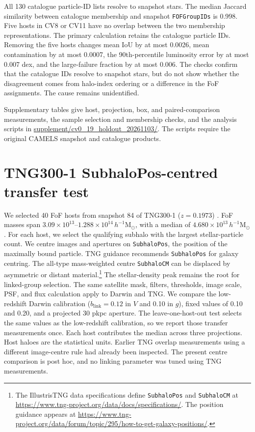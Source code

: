 \documentclass[usenatbib]{mnras}
\begin{document}
All 130 catalogue particle-ID lists resolve to snapshot stars. The median
Jaccard similarity between catalogue membership and snapshot
\texttt{FOFGroupIDs} is 0.998. Five hosts in CV8 or CV11 have no overlap
between the two membership representations. The primary calculation retains
the catalogue particle IDs. Removing the five hosts changes mean IoU by at
most 0.0026, mean contamination by at most 0.0007, the 90th-percentile
luminosity error by at most 0.007 dex, and the large-failure fraction by at
most 0.006. The checks confirm that the catalogue IDs resolve to snapshot
stars, but do not show whether the disagreement comes from halo-index ordering
or a difference in the FoF assignments. The cause remains unidentified.

Supplementary tables give host, projection, box, and paired-comparison
measurements, the sample selection and membership checks, and the
analysis scripts in
\url{supplement/cv0_19_holdout_20261103/}. The scripts require the
original CAMELS snapshot and catalogue products.

\section{TNG300-1 SubhaloPos-centred transfer test}

We selected 40 FoF hosts from snapshot 84 of TNG300-1 ($z=0.1973$)
\citep{nelson2019tng,pillepich2018tng,springel2018tng,nelson2018tng,naiman2018tng,marinacci2018tng}.
FoF masses span $3.09\times10^{13}$--$1.288\times10^{14}\,
h^{-1}\mathrm{M}_{\odot}$, with a median of
$4.680\times10^{13}\,h^{-1}\mathrm{M}_{\odot}$. For each host, we select the
qualifying subhalo with the largest stellar-particle count. We centre images
and apertures on \texttt{SubhaloPos}, the position of the maximally bound
particle. TNG guidance recommends \texttt{SubhaloPos} for galaxy centring.
The all-type mass-weighted centre \texttt{SubhaloCM} can be displaced by
asymmetric or distant material.\footnote{The IllustrisTNG data specifications
define \texttt{SubhaloPos} and \texttt{SubhaloCM} at
\url{https://www.tng-project.org/data/docs/specifications/}. The position
guidance appears at
\url{https://www.tng-project.org/data/forum/topic/295/how-to-get-galaxy-positions/}.}
The stellar-density peak remains the root for linked-group selection. The
same satellite mask, filters, thresholds, image scale, PSF, and flux
calculation apply to Darwin and TNG. We compare the low-redshift Darwin
calibration ($b_{\mathrm{link}}=0.12$ in $V$ and 0.10 in $g$), fixed values
of 0.10 and 0.20, and a projected 30 pkpc aperture. The leave-one-host-out
test selects the same values as the low-redshift calibration, so we report
those transfer measurements once. Each host contributes the
median across three projections. Host haloes are the statistical units.
Earlier TNG overlap measurements using a different image-centre rule had already been
inspected. The present centre comparison is post hoc, and no linking
parameter was tuned using TNG measurements.
\end{document}
